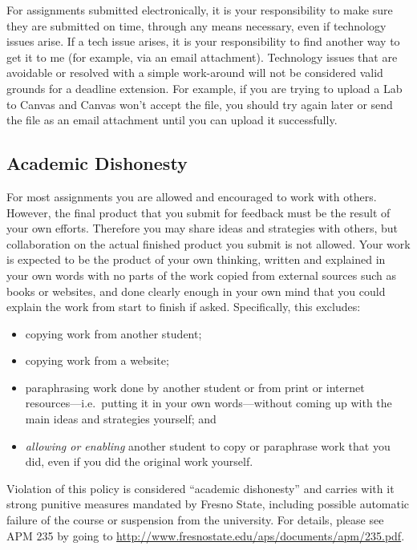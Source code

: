 For assignments submitted electronically, it is your responsibility to
make sure they are submitted on time, through any means necessary, even
if technology issues arise. If a tech issue arises, it is your
responsibility to find another way to get it to me (for example, via an
email attachment). Technology issues that are avoidable or resolved with
a simple work-around will not be considered valid grounds for a deadline
extension. For example, if you are trying to upload a Lab to Canvas and
Canvas won't accept the file, you should try again later or send the
file as an email attachment until you can upload it successfully.

\hypertarget{academic-dishonesty}{%
\subsection{Academic Dishonesty}\label{academic-dishonesty}}

For most assignments you are allowed and encouraged to work with others.
However, the final product that you submit for feedback must be the
result of your own efforts. Therefore you may share ideas and strategies
with others, but collaboration on the actual finished product you submit
is not allowed. Your work is expected to be the product of your own
thinking, written and explained in your own words with no parts of the
work copied from external sources such as books or websites, and done
clearly enough in your own mind that you could explain the work from
start to finish if asked. Specifically, this excludes:

\begin{itemize}
\tightlist
\item
  copying work from another student;
\item
  copying work from a website;
\item
  paraphrasing work done by another student or from print or internet
  resources---i.e.~putting it in your own words---without coming up with
  the main ideas and strategies yourself; and
\item
  \emph{allowing or enabling} another student to copy or paraphrase work
  that you did, even if you did the original work yourself.
\end{itemize}

Violation of this policy is considered ``academic dishonesty'' and
carries with it strong punitive measures mandated by Fresno State,
including possible automatic failure of the course or suspension from
the university. For details, please see APM 235 by going to
\url{http://www.fresnostate.edu/aps/documents/apm/235.pdf}.

